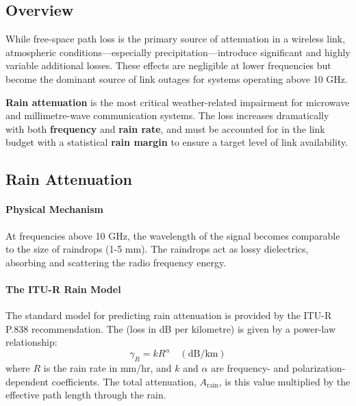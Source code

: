 \subsection{Overview}

While free-space path loss is the primary source of attenuation in a wireless link, atmospheric conditions—especially precipitation—introduce significant and highly variable additional losses. These effects are negligible at lower frequencies but become the dominant source of link outages for systems operating above 10 GHz.

\begin{keyconcept}
    \textbf{Rain attenuation} is the most critical weather-related impairment for microwave and millimetre-wave communication systems. The loss increases dramatically with both \textbf{frequency} and \textbf{rain rate}, and must be accounted for in the link budget with a statistical \textbf{rain margin} to ensure a target level of link availability.
\end{keyconcept}


\subsection{Rain Attenuation}

\paragraph{Physical Mechanism}
At frequencies above 10 GHz, the wavelength of the signal becomes comparable to the size of raindrops (1-5 mm). The raindrops act as lossy dielectrics, absorbing and scattering the radio frequency energy.

\paragraph{The ITU-R Rain Model}
The standard model for predicting rain attenuation is provided by the ITU-R P.838 recommendation. The  (loss in dB per kilometre) is given by a power-law relationship:
\begin{equation}
    \gamma_R = k R^{\alpha} \quad (\text{dB/km})
\end{equation}
where $R$ is the rain rate in mm/hr, and $k$ and $\alpha$ are frequency- and polarization-dependent coefficients. The total attenuation, $A_{\text{rain}}$, is this value multiplied by the effective path length through the rain.

